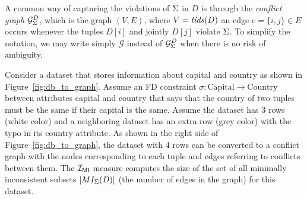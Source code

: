 \def\set#1{\mathord{\{#1\}}}
A common way of capturing the violations of ${\Sigma}$ in $D$ is through the \emph{conflict graph} ${\mathcal{G}_{{\Sigma}}^{D}}$, which is the graph $(V, E)$, where $V=\mathit{tids}(D)$ an edge $e = \set{i,j} \in E$ occurs whenever the tuples $D[i]$ and jointly $D[j]$ violate ${\Sigma}$. 
To simplify the notation, we may write simply $\mathcal{G}$ instead of ${\mathcal{G}_{{\Sigma}}^{D}}$ when there is no risk of ambiguity.

\begin{example}
     Consider a dataset that stores information about capital and country as shown in Figure~\ref{fig:db_to_graph}. Assume an FD constraint $\sigma: \mbox{Capital} \rightarrow \mbox{Country}$ between attributes capital and country that says that the country of two tuples must be the same if their capital is the same. Assume the dataset has 3 rows (white color) and a neighboring dataset has an extra row (grey color) with the typo in its country attribute. As shown in the right side of Figure~\ref{fig:db_to_graph}, the dataset with 4 rows can be converted to a conflict graph with the nodes corresponding to each tuple and edges referring to conflicts between them. The $\mathcal{I_{\mathsf{MI}}}$ measure computes the size of the set of all minimally inconsistent subsets $|MI_{{\Sigma}}(D)|$ (the number of edges in the graph) for this dataset. %
     \label{example:running_example}
\end{example}

